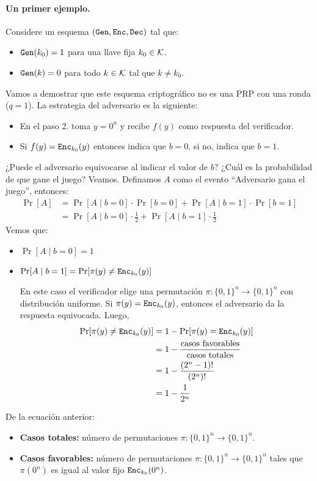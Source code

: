\paragraph{Un primer ejemplo.} Considere un esquema $(\texttt{Gen}, \texttt{Enc}, \texttt{Dec})$ tal que:
\begin{itemize}
    \item $\texttt{Gen}(k_0) = 1$ para una llave fija $k_0 \in \mathcal{K}$.
    \item $\texttt{Gen}(k) = 0$ para todo $k \in \mathcal{K}$ tal que $k \neq k_0$.
\end{itemize}
Vamos a demostrar que este esquema criptográfico no es una PRP con una ronda ($q = 1$). La estrategia del adversario es la siguiente:
\begin{itemize}
    \item En el paso 2. toma $y = 0^n$ y recibe $f(y)$ como respuesta del verificador.
    \item Si $f(y) = \texttt{Enc}_{k_0}(y)$ entonces indica que $b = 0$, si no, indica que $b = 1$.
\end{itemize}
¿Puede el adversario equivocarse al indicar el valor de $b$? ¿Cuál es la probabilidad de que gane el juego? Veamos. Definamos $A$ como el evento ``Adversario gana el juego'', entonces:
\begin{align*}
    \Pr[A] & = \Pr[A \mid b = 0] \cdot \Pr[b = 0] + \Pr[A \mid b = 1] \cdot \Pr[b = 1]   \\
           & = \Pr[A \mid b = 0] \cdot \frac{1}{2} + \Pr[A \mid b = 1] \cdot \frac{1}{2}
\end{align*}
Vemos que:
\begin{itemize}
    \item $\Pr[A \mid b = 0] = 1$
    \item $\Pr[A \mid b = 1] = \Pr[\pi(y) \neq \texttt{Enc}_{k_0}(y)]$

          En este caso el verificador elige una permutación $\pi: \{0,1\}^n \to \{0,1\}^n$ con distribución uniforme. Si $\pi(y) = \texttt{Enc}_{k_0}(y)$, entonces el adversario da la respuesta equivocada. Luego,
          \begin{align*}
              \Pr[\pi(y) \neq \texttt{Enc}_{k_0}(y)] & = 1 - \Pr[\pi(y) = \texttt{Enc}_{k_0}(y)]                          \\
                                             & = 1 - \frac{\text{casos favorables}}{\text{casos totales}} \\
                                             & = 1 - \frac{(2^n - 1)!}{(2^n)!}                            \\
                                             & = 1 - \frac{1}{2^n}
          \end{align*}
\end{itemize}
De la ecuación anterior:
\begin{itemize}
    \item \textbf{Casos totales:} número de permutaciones $\pi: \{0,1\}^n \to \{0,1\}^n$.
    \item \textbf{Casos favorables:} número de permutaciones $\pi: \{0,1\}^n \to \{0,1\}^n$ tales que $\pi(0^n)$ es igual al valor fijo $\texttt{Enc}_{k_0}(0^n)$.
\end{itemize}

